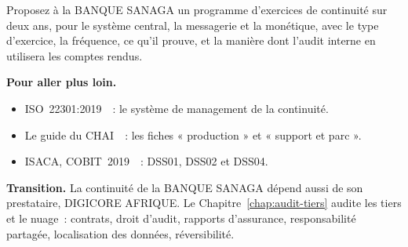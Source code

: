 \begin{boxexo}[title={\ding{45}\quad Exercice~23.10. Un programme d'exercices \niveauexpert}]
Proposez à la BANQUE SANAGA un programme d'exercices de continuité sur deux
ans, pour le système central, la messagerie et la monétique, avec le type
d'exercice, la fréquence, ce qu'il prouve, et la manière dont l'audit
interne en utilisera les comptes rendus.
\end{boxexo}

\bigskip

\begin{boxinfo}
\textbf{Pour aller plus loin.}
\begin{itemize}
    \item ISO~22301:2019~\cite{iso22301_2019}~: le système de management de
          la continuité.
    \item Le guide du CHAI~\cite{chai2014guide}~: les fiches
          « production » et « support et parc ».
    \item ISACA, COBIT~2019~\cite{isaca2018cobitobjectifs}~: DSS01, DSS02
          et DSS04.
\end{itemize}
\end{boxinfo}

\begin{boxinfo}
\textbf{Transition.} La continuité de la BANQUE SANAGA dépend aussi de son
prestataire, DIGICORE AFRIQUE. Le Chapitre~\ref{chap:audit-tiers} audite
les tiers et le nuage~: contrats, droit d'audit, rapports d'assurance,
responsabilité partagée, localisation des données, réversibilité.
\end{boxinfo}
